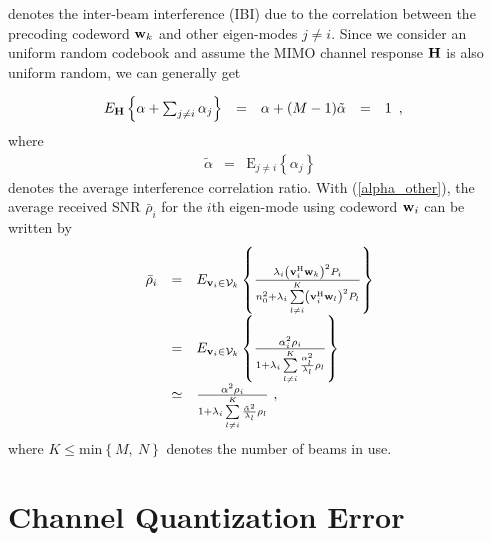 \documentclass[10pt,fleqn, twocolumn]{IEEEtran}
\newcommand{\bH}{{\bf H}}
\newcommand{\bv}{{\bf v}}
\newcommand{\bw}{{\bf w}}
\begin{document}
\noindent denotes the inter-beam interference (IBI) due to the
correlation between the precoding codeword $\bw_{k}$ and other
eigen-modes $j\neq i$. Since we consider an uniform random
codebook and assume the MIMO channel response $\bH$ is also
uniform random, we can generally get

\begin{equation}\hspace{-0.2in}
\begin{array}{rcccl}
\mbox{E}_{\bH}\left\{\alpha + \sum_{j\neq i}\alpha_{j}\right\}& =
& \alpha + (M-1) \tilde\alpha & = &1
\end{array},\label{alpha_other}
\end{equation}
\noindent where
\begin{equation}
\begin{array}{rcl}
\tilde\alpha&=&\mbox{E}_{j\neq i}\left\{\alpha_{j}\right\}
\end{array}
\end{equation}
\noindent denotes the average interference correlation ratio. With
(\ref{alpha_other}), the average received SNR $\bar\rho_{i}$ for
the $i$th eigen-mode using codeword $\bw_{i}$ can be written by
\begin{equation}
\begin{array}{rcl}
\bar\rho_{i}&=&\mbox{E}_{\bv_{i}\in{\cal
V}_{k}}\left\{\frac{\lambda_{i}\left(\bv_{i}^{\rm
H}\bw_{k}\right)^2P_{i}}{n_{0}^2+ \lambda_{i}\sum\limits_{l\neq
i}^{K}\left(\bv_{i}^{\rm H}\bw_{l}\right)^{2}P_{l}}\right\}\\
&=&\mbox{E}_{\bv_{i}\in{\cal
V}_{k}}\left\{\frac{\alpha_{i}^{2}\rho_{i}}{1+
\lambda_{i}\sum\limits_{l\neq
i}^{K}\frac{\alpha_{l}^{2}}{\lambda_{l}}\rho_{l}}\right\}\\
&\simeq&\frac{\alpha^{2}\rho_{i}}{1+ \lambda_{i}\sum\limits_{l\neq
i}^{K}\frac{\tilde{\alpha}^{2}}{\lambda_{l}}\rho_{l}}\ ,
\end{array}
\end{equation}
\noindent where $K\leq\mbox{min}\left\{M,\ N\right\}$ denotes the
number of beams in use.

\section{Channel Quantization Error}
\end{document}
